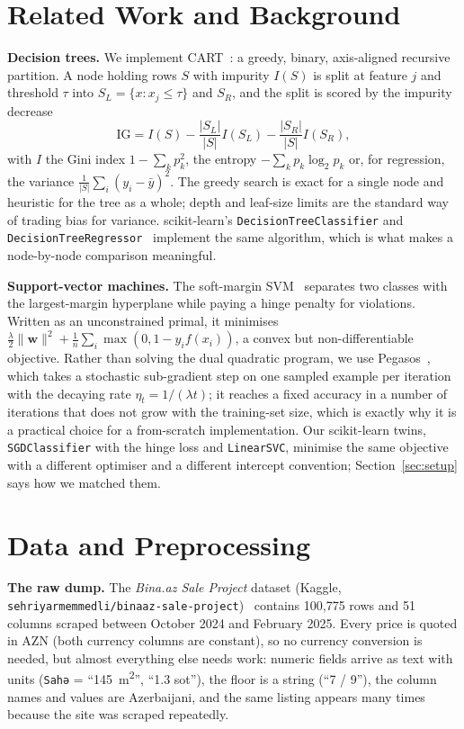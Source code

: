 \documentclass[10pt,twocolumn,a4paper]{article}
\begin{document}
\section{Related Work and Background}
\textbf{Decision trees.} We implement CART~\cite{cart}: a greedy, binary,
axis-aligned recursive partition. A node holding rows $S$ with impurity $I(S)$
is split at feature $j$ and threshold $\tau$ into $S_L=\{x: x_j\le\tau\}$ and
$S_R$, and the split is scored by the impurity decrease
\begin{equation}
  \mathrm{IG} = I(S) - \frac{|S_L|}{|S|}I(S_L) - \frac{|S_R|}{|S|}I(S_R),
\end{equation}
with $I$ the Gini index $1-\sum_k p_k^2$, the entropy $-\sum_k p_k\log_2 p_k$
or, for regression, the variance $\frac{1}{|S|}\sum_i (y_i-\bar y)^2$. The
greedy search is exact for a single node and heuristic for the tree as a
whole; depth and leaf-size limits are the standard way of trading bias for
variance. scikit-learn's \texttt{DecisionTreeClassifier} and
\texttt{DecisionTreeRegressor}~\cite{sklearn} implement the same algorithm,
which is what makes a node-by-node comparison meaningful.

\textbf{Support-vector machines.} The soft-margin SVM~\cite{cortes} separates
two classes with the largest-margin hyperplane while paying a hinge penalty
for violations. Written as an unconstrained primal, it minimises
$\frac{\lambda}{2}\lVert\mathbf{w}\rVert^2 + \frac1n\sum_i\max(0,1-y_i f(x_i))$,
a convex but non-differentiable objective. Rather than solving the dual
quadratic program, we use Pegasos~\cite{pegasos}, which takes a stochastic
sub-gradient step on one sampled example per iteration with the decaying rate
$\eta_t = 1/(\lambda t)$; it reaches a fixed accuracy in a number of
iterations that does not grow with the training-set size, which is exactly why
it is a practical choice for a from-scratch implementation. Our scikit-learn
twins, \texttt{SGDClassifier} with the hinge loss and \texttt{LinearSVC},
minimise the same objective with a different optimiser and a different
intercept convention; Section~\ref{sec:setup} says how we matched them.

\section{Data and Preprocessing}
\label{sec:data}
\textbf{The raw dump.} The \emph{Bina.az Sale Project} dataset (Kaggle,
\texttt{sehriyarmemmedli/binaaz-sale-project})~\cite{dataset} contains 100{,}775
rows and 51 columns scraped between October 2024 and February 2025. Every
price is quoted in AZN (both currency columns are constant), so no currency
conversion is needed, but almost everything else needs work: numeric fields
arrive as text with units (\texttt{Sahə} = ``145~m\textsuperscript{2}'',
``1.3 sot''), the floor is a string (``7 / 9''), the column names and values
are Azerbaijani, and the same listing appears many times because the site was
scraped repeatedly.
\end{document}
